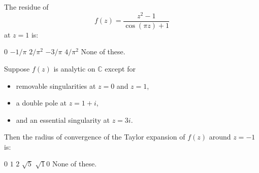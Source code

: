 \documentclass[12pt]{exam}
\newcommand{\CC}{\mathbb{C}}
\begin{document}
\begin{questions}
\question
The residue of
\[
    f(z)=\frac{z^2-1}{\cos(\pi z) + 1}
\]
at $z=1$ is:
\begin{choices}
    \choice $0$
    \choice $-1/\pi$
    \choice $2/\pi^2$
    \choice $-3/\pi$
    \choice $4/\pi^2$
    \choice None of these.
\end{choices}

\question
Suppose $f(z)$ is analytic on $\CC$ except for
\begin{itemize}
    \item removable singularities at $z=0$ and $z=1$,
    \item a double pole at $z=1+i$,
    \item and an essential singularity at $z=3i$.
\end{itemize}
Then the radius of convergence of the Taylor expansion of $f(z)$ around $z=-1$ is:

\begin{choices}
    \choice $0$
    \choice $1$
    \choice $2$
    \choice $\sqrt 5$
    \choice $\sqrt 10$
    \choice None of these.
\end{choices}
\end{questions}
\end{document}
